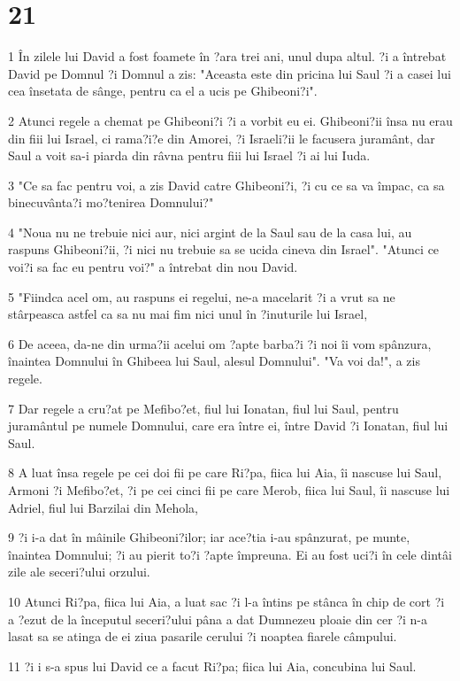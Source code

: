 \chapter{21}

\par 1 În zilele lui David a fost foamete în ?ara trei ani, unul dupa altul. ?i a întrebat David pe Domnul ?i Domnul a zis: "Aceasta este din pricina lui Saul ?i a casei lui cea însetata de sânge, pentru ca el a ucis pe Ghibeoni?i".
\par 2 Atunci regele a chemat pe Ghibeoni?i ?i a vorbit eu ei. Ghibeoni?ii însa nu erau din fiii lui Israel, ci rama?i?e din Amorei, ?i Israeli?ii le facusera juramânt, dar Saul a voit sa-i piarda din râvna pentru fiii lui Israel ?i ai lui Iuda.
\par 3 "Ce sa fac pentru voi, a zis David catre Ghibeoni?i, ?i cu ce sa va împac, ca sa binecuvânta?i mo?tenirea Domnului?"
\par 4 "Noua nu ne trebuie nici aur, nici argint de la Saul sau de la casa lui, au raspuns Ghibeoni?ii, ?i nici nu trebuie sa se ucida cineva din Israel". "Atunci ce voi?i sa fac eu pentru voi?" a întrebat din nou David.
\par 5 "Fiindca acel om, au raspuns ei regelui, ne-a macelarit ?i a vrut sa ne stârpeasca astfel ca sa nu mai fim nici unul în ?inuturile lui Israel,
\par 6 De aceea, da-ne din urma?ii acelui om ?apte barba?i ?i noi îi vom spânzura, înaintea Domnului în Ghibeea lui Saul, alesul Domnului". "Va voi da!", a zis regele.
\par 7 Dar regele a cru?at pe Mefibo?et, fiul lui Ionatan, fiul lui Saul, pentru juramântul pe numele Domnului, care era între ei, între David ?i Ionatan, fiul lui Saul.
\par 8 A luat însa regele pe cei doi fii pe care Ri?pa, fiica lui Aia, îi nascuse lui Saul, Armoni ?i Mefibo?et, ?i pe cei cinci fii pe care Merob, fiica lui Saul, îi nascuse lui Adriel, fiul lui Barzilai din Mehola,
\par 9 ?i i-a dat în mâinile Ghibeoni?ilor; iar ace?tia i-au spânzurat, pe munte, înaintea Domnului; ?i au pierit to?i ?apte împreuna. Ei au fost uci?i în cele dintâi zile ale seceri?ului orzului.
\par 10 Atunci Ri?pa, fiica lui Aia, a luat sac ?i l-a întins pe stânca în chip de cort ?i a ?ezut de la începutul seceri?ului pâna a dat Dumnezeu ploaie din cer ?i n-a lasat sa se atinga de ei ziua pasarile cerului ?i noaptea fiarele câmpului.
\par 11 ?i i s-a spus lui David ce a facut Ri?pa; fiica lui Aia, concubina lui Saul.
